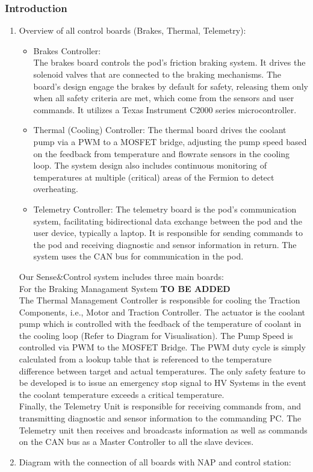 \subsubsection{Introduction}
\begin{enumerate}
    \item Overview of all control boards (Brakes, Thermal, Telemetry):
    \begin{itemize}
        \item Brakes Controller: \\
        The brakes board controls the pod's friction braking system.
        It drives the solenoid valves that are connected to the braking mechanisms.
        The board's design engage the brakes by default for safety, releasing them only when all safety criteria are met,
        which come from the sensors and user commands. 
        It utilizes a Texas Instrument C2000 series microcontroller.
        \item Thermal (Cooling) Controller: The thermal board drives the coolant pump via a PWM to a MOSFET bridge, adjusting the pump speed based on the feedback from temperature and flowrate sensors in the cooling loop.
        The system design also includes continuous monitoring of temperatures at multiple (critical) areas of the Fermion to detect overheating. 
        \item Telemetry Controller: The telemetry board is the pod's communication system, facilitating bidirectional data exchange between the pod and the user device, typically a laptop.
        It is responsible for sending commands to the pod and receiving diagnostic and sensor information in return.
        The system uses the CAN bus for communication in the pod.
    \end{itemize}
  
Our Sense\&Control system includes three main boards: \\
For the Braking Managament System \textbf{TO BE ADDED} \\
The Thermal Management Controller is responsible for cooling the Traction Components, i.e., Motor and Traction Controller. The actuator is the coolant pump which is controlled  with the feedback of the temperature of coolant in the cooling loop (Refer to Diagram for Visualisation).  The Pump Speed is controlled via PWM to the MOSFET Bridge. The PWM duty cycle is simply calculated from a lookup table that is referenced to the temperature difference between target and actual temperatures. The only safety feature to be developed is to issue an emergency stop signal to HV Systems in the event the coolant temperature exceeds a critical temperature. \\
Finally, the Telemetry Unit is responsible for receiving commands from, and transmitting diagnostic and sensor information to the commanding PC. The Telemetry unit then receives and broadcasts information as well as commands on the CAN bus as a Master Controller to all the slave devices. 
    \item Diagram with the connection of all boards with NAP and control station:


\end{enumerate}

